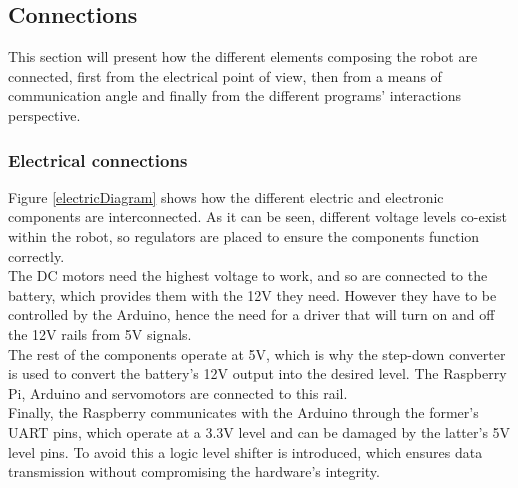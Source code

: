 \subsection{Connections}

This section will present how the different elements composing the robot are connected, first from the electrical point of view, then from a means of communication angle and finally from the different programs' interactions perspective.




\subsubsection{Electrical connections}

Figure \ref{electricDiagram} shows how the different electric and electronic components are interconnected.  As it can be seen, different voltage levels co-exist within the robot, so regulators are placed to ensure the components function correctly. \\

The DC motors need the highest voltage to work, and so are connected to the battery, which provides them with the 12V they need. However they have to be controlled by the Arduino, hence the need for a driver that will turn on and off the 12V rails from 5V signals.\\

The rest of the components operate at 5V, which is why the step-down converter is used to convert the battery's 12V output into the desired level. The Raspberry Pi, Arduino and servomotors are connected to this rail.\\

Finally, the Raspberry communicates with the Arduino through the former's UART pins, which operate at a 3.3V level and can be damaged by the latter's 5V level pins. To avoid this a logic level shifter is introduced, which ensures data transmission without compromising the hardware's integrity.\\

